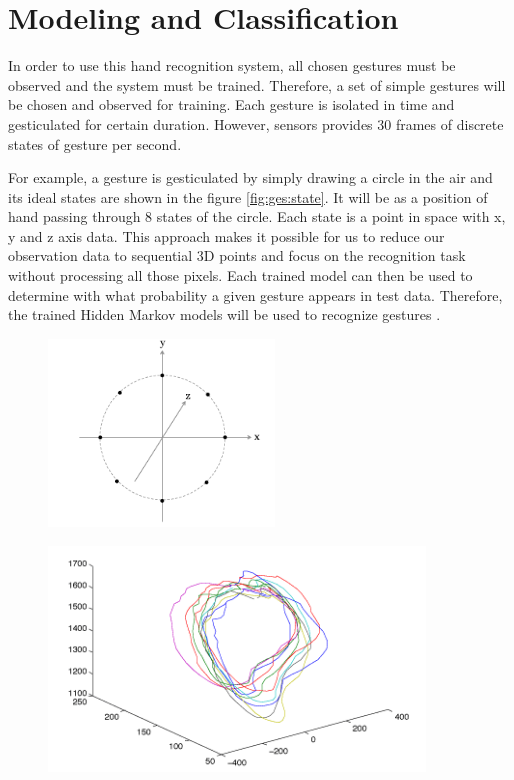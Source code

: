 \section{Modeling and Classification}
In order to use this hand recognition system, all chosen gestures must be observed and the system must be trained. Therefore, a set of simple gestures will be chosen and observed for training. Each gesture is isolated in time and gesticulated for certain duration. However, sensors provides 30 frames of discrete states of gesture per second. 

For example, a gesture is gesticulated by simply drawing a circle in the air and its ideal states are shown in the figure \ref{fig:ges:state}. It will be  as a position of hand passing through 8 states of the circle. Each state is a point in space with x, y and z axis data. This approach makes it possible for us to reduce our observation data to sequential 3D points and focus on the recognition task without processing all those pixels. Each trained model can then be used to determine with what probability a given gesture appears in test data. Therefore, the trained Hidden Markov models will be used to recognize gestures \cite{2}. 

\begin{figure}
	\centering
	\begin{minipage}{.3\textwidth}
		\centering
		\includegraphics[width=6cm]{figures/ges-states.png}
		\label{fig:ges:state}
	\end{minipage}%
	\begin{minipage}{.7\textwidth}
		\centering
		\includegraphics[width=10cm]{figures/ges-train.png}
		\label{fig:ges:train}
	\end{minipage}
\end{figure}

